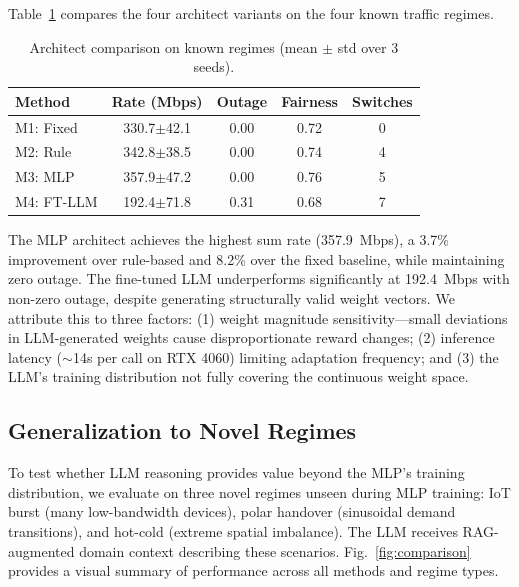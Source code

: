 \documentclass[conference]{IEEEtran}
\begin{document}
Table~\ref{tab:main} compares the four architect variants on the four known traffic regimes.

\begin{table}[t]
\centering
\caption{Architect comparison on known regimes (mean $\pm$ std over 3 seeds).}
\label{tab:main}
\begin{tabular}{lcccc}
\toprule
Method & Rate (Mbps) & Outage & Fairness & Switches \\
\midrule
M1: Fixed    & 330.7$\pm$42.1 & 0.00 & 0.72 & 0 \\
M2: Rule     & 342.8$\pm$38.5 & 0.00 & 0.74 & 4 \\
M3: MLP      & 357.9$\pm$47.2 & 0.00 & 0.76 & 5 \\
M4: FT-LLM   & 192.4$\pm$71.8 & 0.31 & 0.68 & 7 \\
\bottomrule
\end{tabular}
\end{table}

The MLP architect achieves the highest sum rate (357.9~Mbps), a 3.7\% improvement over rule-based and 8.2\% over the fixed baseline, while maintaining zero outage. The fine-tuned LLM underperforms significantly at 192.4~Mbps with non-zero outage, despite generating structurally valid weight vectors. We attribute this to three factors: (1) weight magnitude sensitivity---small deviations in LLM-generated weights cause disproportionate reward changes; (2) inference latency ($\sim$14s per call on RTX 4060) limiting adaptation frequency; and (3) the LLM's training distribution not fully covering the continuous weight space.

\subsection{Generalization to Novel Regimes}

To test whether LLM reasoning provides value beyond the MLP's training distribution, we evaluate on three novel regimes unseen during MLP training: IoT burst (many low-bandwidth devices), polar handover (sinusoidal demand transitions), and hot-cold (extreme spatial imbalance). The LLM receives RAG-augmented domain context describing these scenarios. Fig.~\ref{fig:comparison} provides a visual summary of performance across all methods and regime types.
\end{document}
